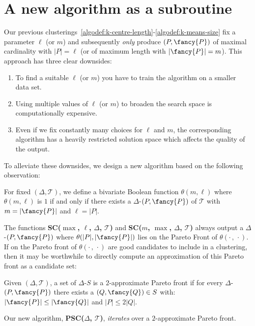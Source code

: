 \section{A new algorithm as a subroutine}
\label{sec:pareto}
%
Our previous clusterings~\ref{algodef:k-centre-length}-\ref{algodef:k-means-size} fix a parameter $\ell$ (or $m$) and subsequently  \emph{only} produce \pathlets $(P, {\fancy{P}})$ of maximal cardinality with  $|P| = \ell$ (or of maximum length with $| {\fancy{P}}| = m$). 
%
This approach has three clear downsides:
%
\begin{enumerate}
    \item To find a suitable $\ell$ (or $m$) you have to train the algorithm on a smaller data set. 
    \item Using multiple values of $\ell$ (or $m$) to broaden the search space is computationally expensive. 
    \item Even if we fix constantly many choices for $\ell$ and $m$, the corresponding algorithm has a heavily restricted solution space which affects the quality of the output. 
\end{enumerate}
%
\noindent
To alleviate these downsides, we design a new algorithm based on the following observation: 
%
\begin{definition}
    For fixed $(\Delta, \mathcal{T})$, we define a bivariate Boolean function $\theta(m, \ell)$ where $\theta(m, \ell)$ is $1$ if and only if there exists a $\Delta$-\pathlet $(P, {\fancy{P}})$ of $\mathcal{T}$ with $m = |{\fancy{P}}|$ and $\ell = |P|$.  
\end{definition}
%
\noindent
The functions \textbf{SC($\max$, $\ell$, $\Delta$, $\mathcal{T}$)} and
\textbf{SC($m$, $\max$, $\Delta$, $\mathcal{T}$)} always output a $\Delta$-\pathlet $(P, {\fancy{P}})$ where $\theta(|P|, |{\fancy{P}}|)$ lies on the Pareto Front of $\theta(\cdot \, , \,  \cdot)$. 
If \pathlets on the Pareto front of $\theta(\cdot \, , \,  \cdot)$ are good candidates to include in a clustering, then it may be worthwhile to directly compute an approximation of this Pareto front as a candidate set:
%
\begin{definition}
    Given $(\Delta, \mathcal{T})$, a set of $\Delta$-\pathlets $S$ is a $2$-approximate Pareto front if for every $\Delta$-\pathlet $(P, {\fancy{P}})$ there exists a $(Q, {\fancy{Q}}) \in S$ with:
    $|{\fancy{P}}| \leq |{\fancy{Q}}| $ and $|P| \leq 2 |Q|$.
\end{definition}
%
\noindent
Our new algorithm,  \textbf{PSC($\Delta$, $\mathcal{T}$)}, \emph{iterates} over a $2$-approximate Pareto front. 
